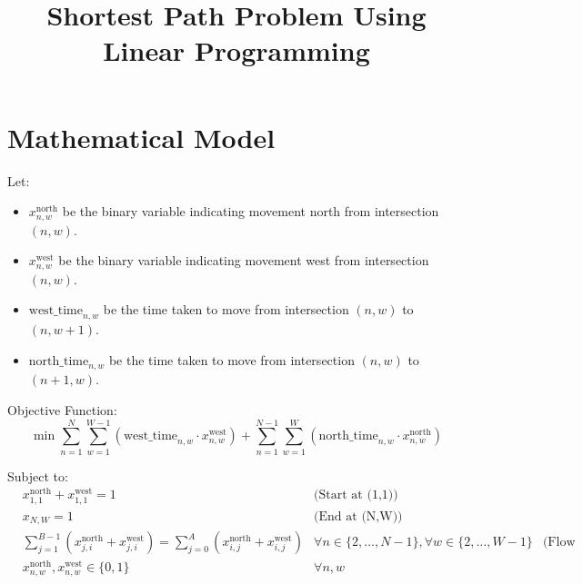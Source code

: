 \documentclass{article}
\begin{document}
\title{Shortest Path Problem Using Linear Programming}
\author{}
\date{}
\maketitle

\section*{Mathematical Model}

Let:
\begin{itemize}
    \item \( x_{n,w}^{\text{north}} \) be the binary variable indicating movement north from intersection \((n, w)\).
    \item \( x_{n,w}^{\text{west}} \) be the binary variable indicating movement west from intersection \((n, w)\).
    \item \( \text{west\_time}_{n,w} \) be the time taken to move from intersection \((n, w)\) to \((n, w+1)\).
    \item \( \text{north\_time}_{n,w} \) be the time taken to move from intersection \((n, w)\) to \((n+1, w)\).
\end{itemize}

Objective Function:
\[
\min \sum_{n=1}^{N} \sum_{w=1}^{W-1} \left( \text{west\_time}_{n,w} \cdot x_{n,w}^{\text{west}} \right) + \sum_{n=1}^{N-1} \sum_{w=1}^{W} \left( \text{north\_time}_{n,w} \cdot x_{n,w}^{\text{north}} \right)
\]

Subject to:
\begin{align*}
    & x_{1,1}^{\text{north}} + x_{1,1}^{\text{west}} = 1 & \text{(Start at (1,1))}\\
    & x_{N,W} = 1 & \text{(End at (N,W))}\\
    & \sum_{j=1}^{B-1} \left( x_{j,i}^{\text{north}} + x_{j,i}^{\text{west}} \right) = \sum_{j=0}^{A} \left( x_{i,j}^{\text{north}} + x_{i,j}^{\text{west}} \right) & \forall n \in \{2, \ldots, N-1\}, \forall w \in \{2, \ldots, W-1\} & \text{(Flow conservation)}\\
    & x_{n,w}^{\text{north}}, x_{n,w}^{\text{west}} \in \{0, 1\} & \forall n, w
\end{align*}
\end{document}
